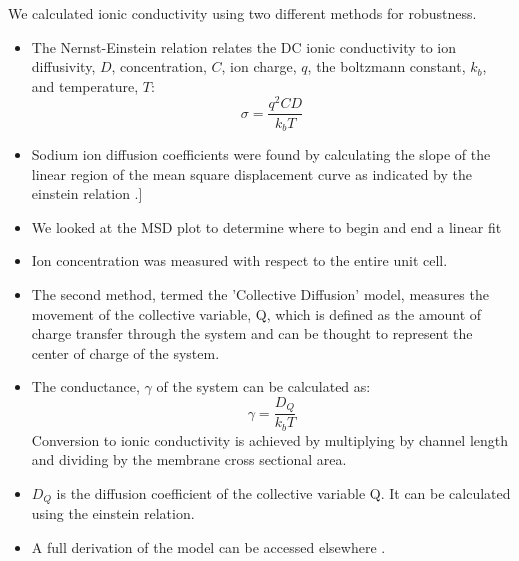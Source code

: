\documentclass{article}
\begin{document}
  We calculated ionic conductivity using two different methods for robustness.
  \begin{itemize}
    \item The Nernst-Einstein relation relates the DC ionic conductivity to 
    ion diffusivity, $D$, concentration, $C$, ion charge, $q$, the boltzmann 
    constant, $k_b$, and temperature, $T$: $$\sigma = \dfrac{q^2CD}{k_b T}$$  %
    \item Sodium ion diffusion coefficients were found by calculating the slope
    of the linear region of the mean square displacement curve as indicated by
    the einstein relation \cite{einstein_investigations_1956}.]
    \item We looked at the MSD plot to determine where to begin and end a linear fit
    \item Ion concentration was measured with respect to the entire unit cell. 
    \item The second method, termed the 'Collective Diffusion' model, measures 
    the movement of the collective variable, Q, which is defined as the amount
    of charge transfer through the system and can be thought to represent
    the center of charge of the system.
    \item The conductance, $\gamma$ of the system can be calculated as:
    $$ \gamma = \dfrac{D_Q}{k_b T} $$ Conversion to ionic conductivity is
    achieved by multiplying by channel length and dividing by the membrane
    cross sectional area.
    \item $D_Q$ is the diffusion coefficient of the collective variable Q. It can
    be calculated using the einstein relation.
    \item A full derivation of the model can be accessed elsewhere \cite{liu_collective_2013}.
  \end{itemize}
    
\end{document}
